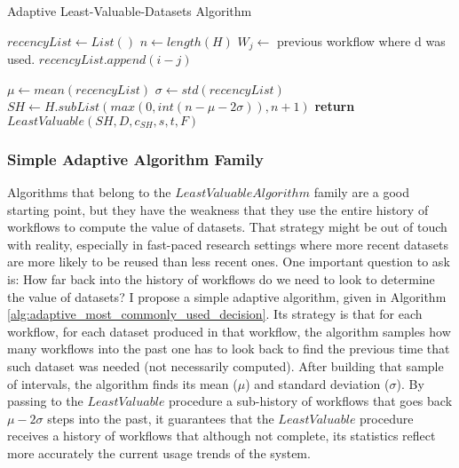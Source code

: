 \begin{algorithm}
\begin{singlespace}
\caption{Adaptive Least-Valuable-Datasets Algorithm}
\label{alg:adaptive_most_commonly_used_decision}
\begin{algorithmic}[1]
	\State $recencyList \gets List()$
	\State $n \gets length(H)$
			\State $W_j \gets$ previous workflow where d was used.
				\State $recencyList.append(i - j)$
			\EndIf
		\EndFor
			
	\EndFor
	\State $\mu \gets mean(recencyList)$
	\State $\sigma \gets std(recencyList)$
	\State $SH \gets H.subList(max(0, int(n - \mu - 2\sigma)), n + 1)$
	\State \textbf{return} $LeastValuable(SH, D, c_{SH}, s, t, F)$

\EndProcedure
\end{algorithmic}
\end{singlespace}
\end{algorithm}

\subsubsection{Simple Adaptive Algorithm Family}
Algorithms that belong to the $Least Valuable Algorithm$ family are a good starting point, but they have the weakness that they use the entire history of workflows to compute the value of datasets. That strategy might be out of touch with reality, especially in fast-paced research settings where more recent datasets are more likely to be reused than less recent ones. One important question to ask is: How far back into the history of workflows do we need to look to determine the value of datasets? I propose a simple adaptive algorithm, given in Algorithm \ref{alg:adaptive_most_commonly_used_decision}.  Its strategy is that for each workflow, for each dataset produced in that workflow, the algorithm samples how many workflows into the past one has to look back to find the previous time that such dataset was needed (not necessarily computed).  After building that sample of intervals, the algorithm finds its mean ($\mu$) and standard deviation ($\sigma$).  By passing to the $LeastValuable$ procedure a sub-history of workflows that goes back $\mu - 2\sigma$ steps into the past, it guarantees that the $LeastValuable$ procedure receives a history of workflows that although not complete, its statistics reflect more accurately the current usage trends of the system.
